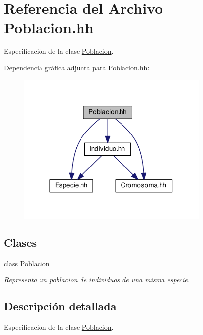 \hypertarget{_poblacion_8hh}{}\section{Referencia del Archivo Poblacion.\+hh}
\label{_poblacion_8hh}


Especificación de la clase \hyperlink{class_poblacion}{Poblacion}.  


Dependencia gráfica adjunta para Poblacion.\+hh\+:\nopagebreak
\begin{figure}[H]
\begin{center}
\leavevmode
\includegraphics[width=266pt]{_poblacion_8hh__incl}
\end{center}
\end{figure}
\subsection*{Clases}
\begin{DoxyCompactItemize}
\item 
class \hyperlink{class_poblacion}{Poblacion}
\begin{DoxyCompactList}\small\item\em Representa un poblacion de individuos de una misma especie. \end{DoxyCompactList}\end{DoxyCompactItemize}


\subsection{Descripción detallada}
Especificación de la clase \hyperlink{class_poblacion}{Poblacion}. 

